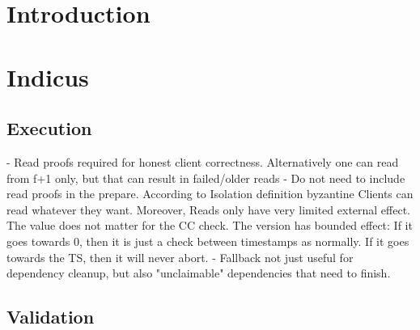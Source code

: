 \section{Introduction}







\section{Indicus}











\subsection{Execution}
- Read proofs required for honest client correctness. Alternatively one can read from f+1 only, but that can result in failed/older reads
- Do not need to include read proofs in the prepare. According to Isolation definition byzantine Clients can read whatever they want. Moreover, Reads only have very limited external effect. The value does not matter for the CC check. The version has bounded effect: If it goes towards 0, then it is just a check between timestamps as normally. If it goes towards the TS, then it will never abort.
- Fallback not just useful for dependency cleanup, but also "unclaimable" dependencies that need to finish.
\subsection{Validation}

